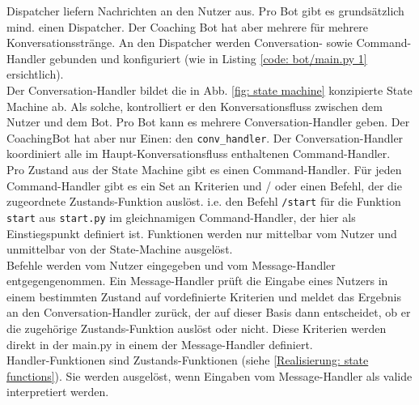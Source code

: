         Dispatcher liefern Nachrichten an den Nutzer aus. Pro Bot gibt es grundsätzlich mind. einen Dispatcher. Der Coaching Bot hat aber mehrere für mehrere Konversationsstränge. An den Dispatcher werden Conversation- sowie Command-Handler gebunden und konfiguriert (wie in Listing \ref*{code: bot/main.py 1} ersichtlich).\\
        Der Conversation-Handler bildet die in Abb. \ref*{fig: state machine} konzipierte State Machine ab. Als solche, kontrolliert er den Konversationsfluss zwischen dem Nutzer und dem Bot. Pro Bot kann es mehrere Conversation-Handler geben. Der CoachingBot hat aber nur Einen: den \verb|conv_handler|. Der Conversation-Handler koordiniert alle im Haupt-Konversationsfluss enthaltenen Command-Handler.\\
        Pro Zustand aus der State Machine gibt es einen Command-Handler. Für jeden Command-Handler gibt es ein Set an Kriterien und / oder einen Befehl, der die zugeordnete Zustands-Funktion auslöst. i.e. den Befehl \verb|/start| für die Funktion \verb|start| aus \verb|start.py| im gleichnamigen Command-Handler, der hier als Einstiegspunkt definiert ist. Funktionen werden nur mittelbar vom Nutzer und unmittelbar von der State-Machine ausgelöst.\\
        Befehle werden vom Nutzer eingegeben und vom Message-Handler entgegengenommen. Ein Message-Handler prüft die Eingabe eines Nutzers in einem bestimmten Zustand auf vordefinierte Kriterien und meldet das Ergebnis an den Conversation-Handler zurück, der auf dieser Basis dann entscheidet, ob er die zugehörige Zustands-Funktion auslöst oder nicht. Diese Kriterien werden direkt in der main.py in einem der Message-Handler definiert. \\
        Handler-Funktionen sind Zustands-Funktionen (siehe \ref*{Realisierung: state functions}). Sie werden ausgelöst, wenn Eingaben vom Message-Handler als valide interpretiert werden. 

